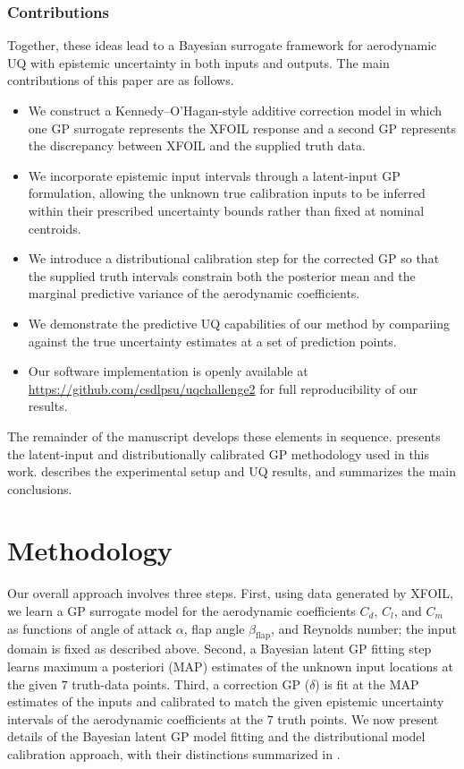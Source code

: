 \documentclass[a4paper,12pt]{article}
\begin{document}
\subsubsection{Contributions}
Together, these ideas lead to a Bayesian surrogate framework for aerodynamic UQ with epistemic uncertainty in both inputs and outputs. The main contributions of this paper are as follows.
\begin{itemize}
    \item We construct a Kennedy--O'Hagan-style additive correction model in which one GP surrogate represents the XFOIL response and a second GP represents the discrepancy between XFOIL and the supplied truth data.
    \item We incorporate epistemic input intervals through a latent-input GP formulation, allowing the unknown true calibration inputs to be inferred within their prescribed uncertainty bounds rather than fixed at nominal centroids.
    \item We introduce a distributional calibration step for the corrected GP so that the supplied truth intervals constrain both the posterior mean and the marginal predictive variance of the aerodynamic coefficients.
    \item We demonstrate the predictive UQ capabilities of our method by compariing against the true uncertainty estimates at a set of prediction points.
    \item Our software implementation is openly available at \url{https://github.com/csdlpsu/uqchallenge2} for full reproducibility of our results.
\end{itemize}
The remainder of the manuscript develops these elements in sequence.  presents the latent-input and distributionally calibrated GP methodology used in this work.  describes the experimental setup and UQ results, and  summarizes the main conclusions.

\section{Methodology}
\label{sec:method}
Our overall approach involves three steps. First, using data generated by XFOIL, we learn a GP surrogate model for the aerodynamic coefficients $C_d$, $C_l$, and $C_m$ as functions of angle of attack $\alpha$, flap angle $\beta_{\mathrm{flap}}$, and Reynolds number; the input domain is fixed as described above. Second, a Bayesian latent GP fitting step learns maximum a posteriori (MAP) estimates of the unknown input locations at the given $7$ truth-data points. Third, a correction GP ($\delta$) is fit at the MAP estimates of the inputs and calibrated to match the given epistemic uncertainty intervals of the aerodynamic coefficients at the $7$ truth points. We now present details of the Bayesian latent GP model fitting and the distributional model calibration approach, with their distinctions summarized in .
\end{document}
